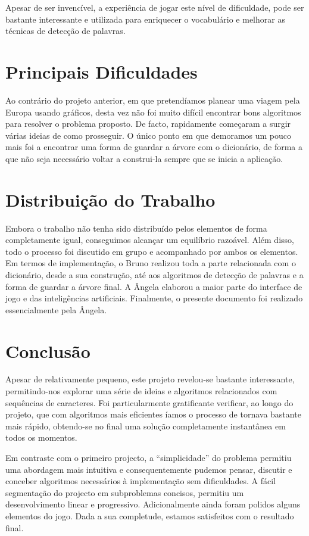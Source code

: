 \documentclass[12pt,a4paper,reqno]{report}
\numberwithin{equation}{section}
\begin{document}
Apesar de ser invencível, a experiência de jogar este nível de dificuldade, pode ser bastante interessante e utilizada para enriquecer o vocabulário e melhorar as técnicas de detecção de palavras.

\chapter{Principais Dificuldades}

Ao contrário do projeto anterior, em que pretendíamos planear uma viagem pela Europa usando gráficos, desta vez não foi muito difícil encontrar bons algoritmos para resolver o problema proposto. De facto, rapidamente começaram a surgir várias ideias de como prosseguir. O único ponto em que demoramos um pouco mais foi a encontrar uma forma de guardar a árvore com o dicionário, de forma a que não seja necessário voltar a construi-la sempre que se inicia a aplicação.

\chapter{Distribuição do Trabalho}

Embora o trabalho não tenha sido distribuído pelos elementos de forma completamente igual, conseguimos alcançar um equilíbrio razoável. Além disso, todo o processo foi discutido em grupo e acompanhado por ambos os elementos. Em termos de implementação, o Bruno realizou toda a parte relacionada com o dicionário, desde a sua construção, até aos algoritmos de detecção de palavras e a forma de guardar a árvore final. A Ângela elaborou a maior parte do interface de jogo e das inteligências artificiais. Finalmente, o presente documento foi realizado essencialmente pela Ângela.

\chapter{Conclusão}

Apesar de relativamente pequeno, este projeto revelou-se bastante interessante, permitindo-nos explorar uma série de ideias e algoritmos relacionados com sequências de caracteres. Foi particularmente gratificante verificar, ao longo do projeto, que com algoritmos mais eficientes íamos o processo de tornava bastante mais rápido, obtendo-se no final uma solução completamente instantânea em todos os momentos.

Em contraste com o primeiro projecto, a ``simplicidade'' do problema permitiu uma abordagem mais intuitiva e consequentemente pudemos pensar, discutir e conceber algoritmos necessários à implementação sem dificuldades. A fácil segmentação do projecto em subproblemas concisos, permitiu um desenvolvimento linear e progressivo. Adicionalmente ainda foram polidos alguns elementos do jogo. Dada a sua completude, estamos satisfeitos com o resultado final.
\end{document}
